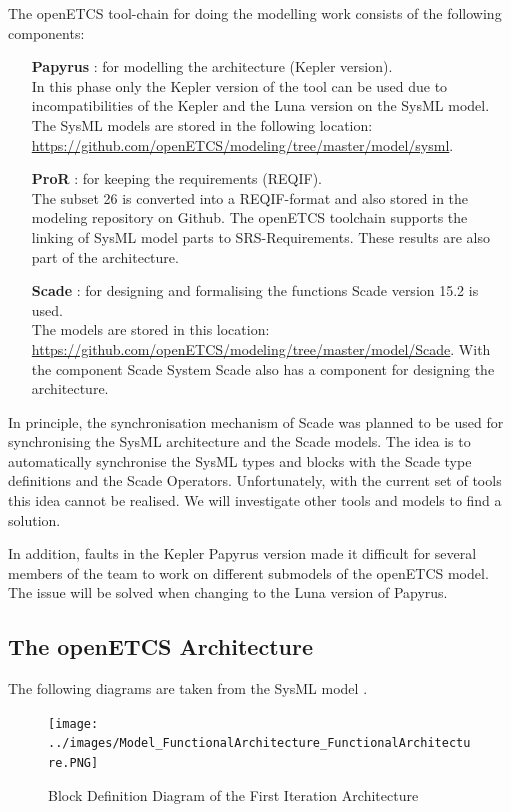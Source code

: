 \documentclass{template/openetcs_article}
\begin{document}
The openETCS tool-chain for doing the modelling work consists of the following components:
\begin{itemize}
	\item [\textbf{Papyrus}]: for modelling the architecture (Kepler version).\\
	In this phase only the Kepler version of the tool can be used due to incompatibilities of the Kepler and the Luna version on the SysML model. The SysML models are stored in the following location: \url{https://github.com/openETCS/modeling/tree/master/model/sysml}.
	\item [\textbf{ProR}]: for keeping the requirements (REQIF).\\
	The subset 26 is converted into a REQIF-format and also stored in the modeling repository on Github. The openETCS toolchain supports the linking of SysML model parts to SRS-Requirements. These results are also part of the architecture.
	\item [\textbf{Scade}]: for designing and formalising the functions Scade version 15.2 is used.\\
	The models are stored in this location: \url{https://github.com/openETCS/modeling/tree/master/model/Scade}.
	With the component Scade System Scade also has a component for designing the architecture.
\end{itemize}

In principle, the synchronisation mechanism of Scade was planned to be used for synchronising the SysML architecture and the Scade models. The idea is to automatically synchronise the SysML types and blocks with the Scade type definitions and the Scade Operators. Unfortunately, with the current set of tools this idea cannot be realised. We will investigate other tools and models to find a solution. 

In addition, faults in the Kepler Papyrus version made it difficult for several members of the team to work on different submodels of the openETCS model. The issue will be solved when changing to the Luna version of Papyrus.



\subsection{The openETCS Architecture}

The following diagrams are taken from the SysML model \cite{sysml-model}.

\begin{figure}[h]
	\centering
	\texttt{[image: ../images/Model\_FunctionalArchitecture\_FunctionalArchitecture.PNG]}
	\caption{Block Definition Diagram of the First Iteration Architecture}
\end{figure}
\end{document}
